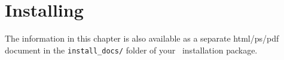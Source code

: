 \chapter{Installing \MCS}
\label{installing}
The information in this chapter is also available as a separate
html/ps/pdf document in the \texttt{install\_docs/} folder of your
\MCS\ installation package.

